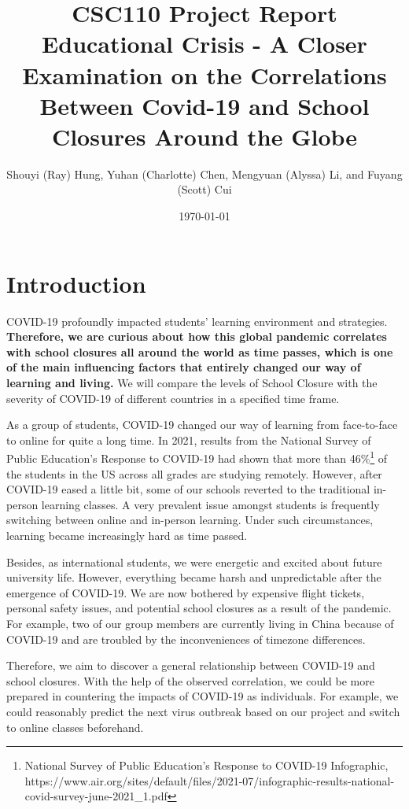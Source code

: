 \documentclass[fontsize=11pt]{article}
\title{CSC110 Project Report\\ Educational Crisis - A Closer Examination on the Correlations Between Covid-19 and School Closures Around the Globe}
\author{Shouyi (Ray) Hung, Yuhan (Charlotte) Chen, Mengyuan (Alyssa) Li, and Fuyang (Scott) Cui}
\date{\today}
\begin{document}
    \maketitle

    \tableofcontents

    \newpage

    \section{Introduction}

    COVID-19 profoundly impacted students’ learning environment and strategies. \textbf{Therefore, we are curious about how this global pandemic correlates with school closures all around the world as time passes, which is one of the main influencing factors that entirely changed our way of learning and living.} We will compare the levels of School Closure with the severity of COVID-19 of different countries in a specified time frame.

    As a group of students, COVID-19 changed our way of learning from face-to-face to online for quite a long time. In 2021, results from the National Survey of Public Education's Response to COVID-19 had shown that more than 46\%\footnote{National Survey of Public Education's Response to COVID-19 Infographic, https://www.air.org/sites/default/files/2021-07/infographic-results-national-covid-survey-june-2021\_1.pdf} of the students in the US across all grades are studying remotely. However, after COVID-19 eased a little bit, some of our schools reverted to the traditional in-person learning classes. A very prevalent issue amongst students is frequently switching between online and in-person learning. Under such circumstances, learning became increasingly hard as time passed.

    Besides, as international students, we were energetic and excited about future university life. However, everything became harsh and unpredictable after the emergence of COVID-19. We are now bothered by expensive flight tickets, personal safety issues, and potential school closures as a result of the pandemic. For example, two of our group members are currently living in China because of COVID-19 and are troubled by the inconveniences of timezone differences.

    Therefore, we aim to discover a general relationship between COVID-19 and school closures. With the help of the observed correlation, we could be more prepared in countering the impacts of COVID-19 as individuals. For example, we could reasonably predict the next virus outbreak based on our project and switch to online classes beforehand.
\end{document}
